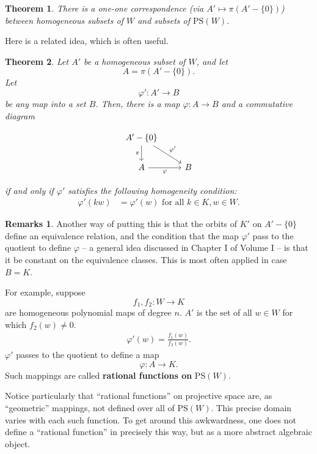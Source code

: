 \documentclass[12pt]{book}
\theoremstyle{plain}
\newtheorem{theorem}{Theorem}[section]
\theoremstyle{definition}
\newtheorem*{remarks}{Remarks}
\begin{document}
\begin{theorem}
    There is a one-one correspondence (via $A' \mapsto \pi(A' - \{0\})$) between homogeneous subsets of $W$ and subsets of $\textrm{PS}(W)$.
\end{theorem}

Here is a related idea, which is often useful.

\begin{theorem}
    Let $A'$ be a homogeneous subset of $W$, and let
    $$A = \pi(A' - \{0\}).$$
    Let
    $$\varphi': A' \to B$$
    be any map into a set $B$.
    Then, there is a map $\varphi: A \to B$ and a commutative diagram

    \begin{equation*}
    \begin{tikzcd}
        A'-\{0\} \arrow[d, "\pi"'] \arrow[dr, "\varphi'"] \\
        A \arrow[r, "\varphi"'] & B
    \end{tikzcd}
    \end{equation*}
    
    if and only if $\varphi'$ satisfies the following homogeneity condition:
    \begin{align}
        \varphi'(kw) &= \varphi'(w) \text{ for all } k \in K, w \in W.
    \end{align}
\end{theorem}

\begin{remarks}
    Another way of putting this is that the orbits of $K'$ on $A' - \{0\}$ define an equivalence relation, and the condition that the map $\varphi'$ pass to the quotient to define $\varphi$ -- a general idea discussed in Chapter I of Volume I -- is that it be constant on the equivalence classes.
    This is most often applied in case $B = K$.

    For example, suppose
    $$f_1, f_2: W \to K$$
    are homogeneous polynomial maps of degree $n$.
    $A'$ is the set of all $w \in W$ for which $f_2(w) \neq 0$.
    \begin{align}
        \varphi'(w) = \frac{f_1(w)}{f_2(w)}.
    \end{align}
    $\varphi'$ passes to the quotient to define a map
    $$\varphi: A \to K.$$
    Such mappings are called \textbf{rational functions on} $\textrm{PS}(W)$.

    Notice particularly that ``rational functions'' on projective space are, as ``geometric'' mappings, not defined over all of $\textrm{PS}(W)$.
    This precise domain varies with each such function.
    To get around this awkwardness, one does not define a ``rational function'' in precisely this way, but as a more abstract algebraic object.
\end{remarks}
\end{document}
